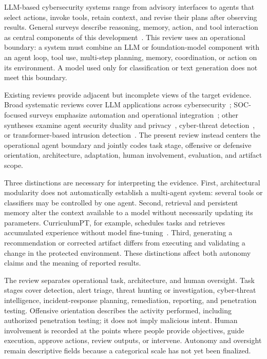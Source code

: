 LLM-based cybersecurity systems range from advisory interfaces to agents that select actions, invoke tools, retain context, and revise their plans after observing results. General surveys describe reasoning, memory, action, and tool interaction as central components of this development~\cite{B1_Wang_2024,B2_Xi_2025,B3_Zhang_2025,B4_Qu_2025,B5_Chowa_2026,B6_Cheng_2026,B7_Xu_2025}. This review uses an operational boundary: a system must combine an LLM or foundation-model component with an agent loop, tool use, multi-step planning, memory, coordination, or action on its environment. A model used only for classification or text generation does not meet this boundary.

Existing reviews provide adjacent but incomplete views of the target evidence. Broad systematic reviews cover LLM applications across cybersecurity~\cite{S1_Xu_2025,S8_Hasanov_2024}; SOC-focused surveys emphasize automation and operational integration~\cite{S2_Habibzadeh_2026,S3_Srinivas_2025}; other syntheses examine agent security duality and privacy~\cite{S5_Xu_2026,S9_He_2025}, cyber-threat detection~\cite{S6_Chen_2024}, or transformer-based intrusion detection~\cite{S7_Kheddar_2025}. The present review instead centers the operational agent boundary and jointly codes task stage, offensive or defensive orientation, architecture, adaptation, human involvement, evaluation, and artifact scope.

Three distinctions are necessary for interpreting the evidence. First, architectural modularity does not automatically establish a multi-agent system: several tools or classifiers may be controlled by one agent. Second, retrieval and persistent memory alter the context available to a model without necessarily updating its parameters. CurriculumPT, for example, schedules tasks and retrieves accumulated experience without model fine-tuning~\cite{R0322_Wu_2025}. Third, generating a recommendation or corrected artifact differs from executing and validating a change in the protected environment. These distinctions affect both autonomy claims and the meaning of reported results.

The review separates operational task, architecture, and human oversight. Task stages cover detection, alert triage, threat hunting or investigation, cyber-threat intelligence, incident-response planning, remediation, reporting, and penetration testing. Offensive orientation describes the activity performed, including authorized penetration testing; it does not imply malicious intent. Human involvement is recorded at the points where people provide objectives, guide execution, approve actions, review outputs, or intervene. Autonomy and oversight remain descriptive fields because a categorical scale has not yet been finalized.
